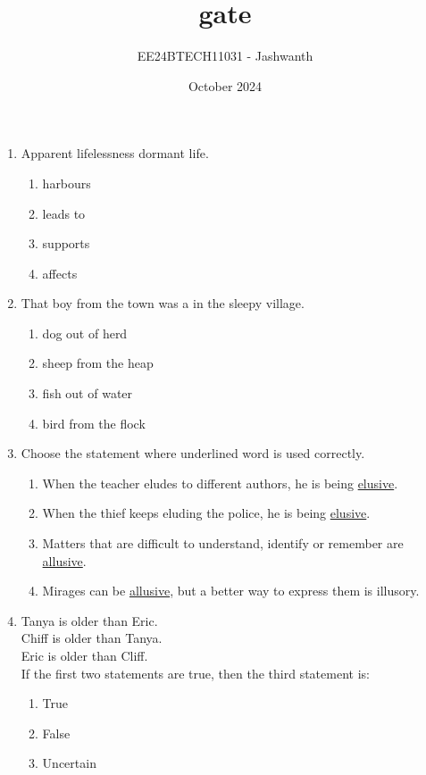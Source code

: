 \documentclass[journal,12pt,onecolumn]{IEEEtran}
\title{gate}
\author{EE24BTECH11031 - Jashwanth}
\date{October 2024}
\theoremstyle{remark}
\begin{document}
\maketitle

\begin{enumerate}
    \item Apparent lifelessness \underline{\phantom{black}} dormant life.
    \begin{enumerate}
        \item harbours
        \item leads to
        \item supports
        \item affects
    \end{enumerate}
    \item That boy from the town was a \underline{\phantom{black}} in the sleepy village.
    \begin{enumerate}
    \item dog out of herd
    \item sheep from the heap
    \item fish out of water
    \item bird from the flock
    \end{enumerate}
    \item Choose the statement where underlined word is used correctly.
    \begin{enumerate}
        \item When the teacher eludes to different authors, he is being \underline{elusive}.
        \item When the thief keeps eluding the police, he is being \underline{elusive}.
        \item Matters that are difficult to understand, identify or remember are \underline{allusive}.
        \item Mirages can be \underline{allusive}, but a better way to express them is illusory.
    \end{enumerate}
    \item Tanya is older than Eric.\\Chiff is older than Tanya.\\Eric is older than Cliff.\\
	    \hfill{If the first two statements are true, then the third statement is:}
    \begin{enumerate}
        \item True
        \item False
        \item Uncertain

\end{enumerate}
\end{enumerate}
\end{document}
